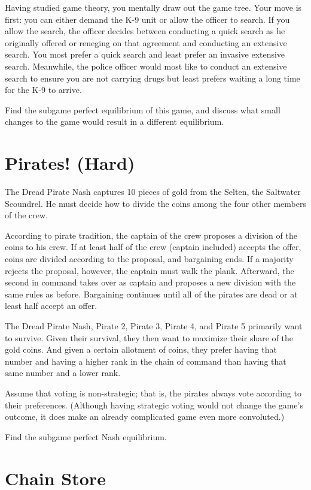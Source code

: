 \documentclass{article}
\begin{document}
Having studied game theory, you mentally draw out the game tree. Your move is first: you can either demand the K-9 unit or allow the officer to search. If you allow the search, the officer decides between conducting a quick search as he originally offered or reneging on that agreement and conducting an extensive search. You most prefer a quick search and least prefer an invasive extensive search. Meanwhile, the police officer would most like to conduct an extensive search to ensure you are not carrying drugs but least prefers waiting a long time for the K-9 to arrive.

Find the subgame perfect equilibrium of this game, and discuss what small changes to the game would result in a different equilibrium.

\section{Pirates! (Hard)}
\label{pirateshard}

The Dread Pirate Nash captures 10 pieces of gold from the Selten, the Saltwater Scoundrel. He must decide how to divide the coins among the four other members of the crew.

According to pirate tradition, the captain of the crew proposes a division of the coins to his crew. If at least half of the crew (captain included) accepts the offer, coins are divided according to the proposal, and bargaining ends. If a majority rejects the proposal, however, the captain must walk the plank. Afterward, the second in command takes over as captain and proposes a new division with the same rules as before. Bargaining continues until all of the pirates are dead or at least half accept an offer.

The Dread Pirate Nash, Pirate 2, Pirate 3, Pirate 4, and Pirate 5 primarily want to survive. Given their survival, they then want to maximize their share of the gold coins. And given a certain allotment of coins, they prefer having that number and having a higher rank in the chain of command than having that same number and a lower rank.

Assume that voting is non-strategic; that is, the pirates always vote according to their preferences. (Although having strategic voting would not change the game’s outcome, it does make an already complicated game even more convoluted.)

Find the subgame perfect Nash equilibrium.

\section{Chain Store}
\end{document}
